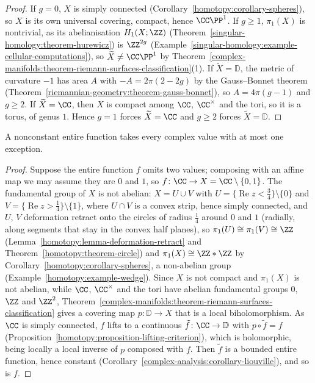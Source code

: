 \begin{proof}
If $g = 0$, $X$ is simply connected (Corollary~\ref{homotopy:corollary-spheres}), so $X$ is its own universal covering, compact, hence $\CC\PP^1$. If $g \geq 1$, $\pi_1(X)$ is
nontrivial, as its abelianisation $H_1(X; \ZZ)$ (Theorem~\ref{singular-homology:theorem-hurewicz}) is $\ZZ^{2g}$
(Example~\ref{singular-homology:example-cellular-computations}), so $\widetilde{X} \neq \CC\PP^1$ by
Theorem~\ref{complex-manifolds:theorem-riemann-surfaces-classification}(1). If $\widetilde{X} = \mathbb{D}$, the metric of curvature $-1$ has area $A$ with $-A = 2\pi(2 - 2g)$ by
the Gauss--Bonnet theorem (Theorem~\ref{riemannian-geometry:theorem-gauss-bonnet}), so $A = 4\pi(g - 1)$ and $g \geq 2$. If $\widetilde{X} = \CC$, then $X$ is compact among
$\CC$, $\CC^\times$ and the tori, so it is a torus, of genus $1$. Hence $g = 1$ forces $\widetilde{X} = \CC$ and $g \geq 2$ forces $\widetilde{X} = \mathbb{D}$.
\end{proof}

\begin{corollary}\label{complex-manifolds:corollary-picard}
A nonconstant entire function takes every complex value with at most one exception.
\end{corollary}

\begin{proof}
Suppose the entire function $f$ omits two values; composing with an affine map we may assume they are $0$ and $1$, so $f \colon \CC \to X = \CC \setminus \{0, 1\}$. The fundamental
group of $X$ is not abelian: $X = U \cup V$ with $U = \{\operatorname{Re}z < \frac34\} \setminus \{0\}$ and $V = \{\operatorname{Re}z > \frac14\} \setminus \{1\}$, where
$U \cap V$ is a convex strip, hence simply connected, and $U$, $V$ deformation retract onto the circles of radius $\frac14$ around $0$ and $1$ (radially, along segments
that stay in the convex half planes), so $\pi_1(U) \cong \pi_1(V) \cong \ZZ$ (Lemma~\ref{homotopy:lemma-deformation-retract} and Theorem~\ref{homotopy:theorem-circle}) and
$\pi_1(X) \cong \ZZ * \ZZ$ by Corollary~\ref{homotopy:corollary-spheres}, a non-abelian group (Example~\ref{homotopy:example-wedge}). Since $X$ is not compact and $\pi_1(X)$ is not abelian, while
$\CC$, $\CC^\times$ and the tori have abelian fundamental groups $0$, $\ZZ$ and $\ZZ^2$, Theorem~\ref{complex-manifolds:theorem-riemann-surfaces-classification} gives a covering
map $p \colon \mathbb{D} \to X$ that is a local biholomorphism. As $\CC$ is simply connected, $f$ lifts to a continuous $\tilde f \colon \CC \to \mathbb{D}$ with $p \circ \tilde f = f$
(Proposition~\ref{homotopy:proposition-lifting-criterion}), which is holomorphic, being locally a local inverse of $p$ composed with $f$. Then $\tilde f$ is a bounded entire function,
hence constant (Corollary~\ref{complex-analysis:corollary-liouville}), and so is $f$.
\end{proof}

